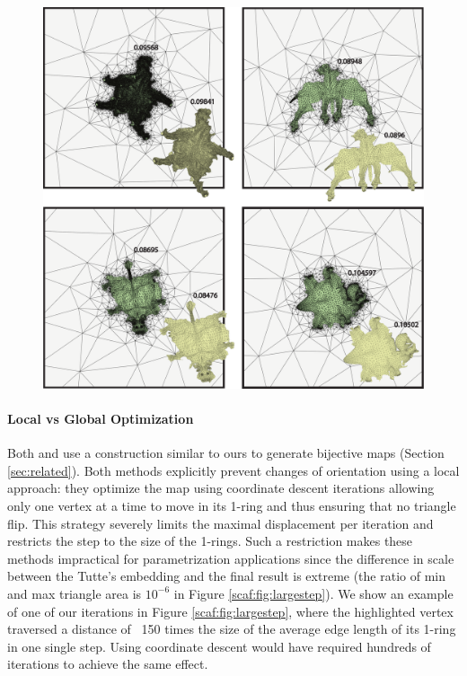 \begin{figure}[t]
\includegraphics[width=\columnwidth]{figs/compare_smith}
\caption{}
\label{scaf:fig:smith-all}
\vspace{-0.2cm}
\end{figure}


\paragraph{Local vs Global Optimization} 

Both \cite{Zhang:2005} and \cite{Misztal:2012} use a construction similar to ours to generate bijective maps (Section \ref{sec:related}). Both methods explicitly prevent changes of orientation using a local approach: they optimize the map using coordinate descent iterations \cite{SolomonBook} allowing only one vertex at a time to move in its 1-ring and thus ensuring that no triangle flip. This strategy severely limits the maximal displacement per iteration and restricts the step to the size of the 1-rings. Such a restriction makes these methods impractical for parametrization applications since the difference in scale between the Tutte's embedding and the final result is extreme (the ratio of min and max triangle area is $10^{-6}$ in Figure \ref{scaf:fig:largestep}). We show an example of one of our iterations in Figure \ref{scaf:fig:largestep}, where the highlighted vertex traversed a distance of ~150 times the size of the average edge length of its 1-ring in one single step. Using coordinate descent would have required hundreds of iterations to achieve the same effect. 

